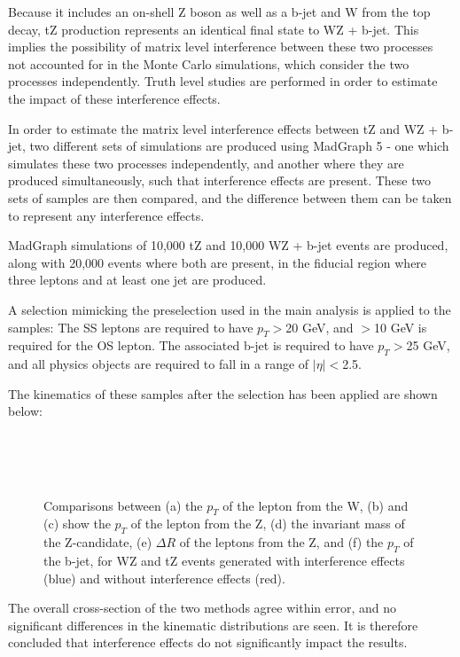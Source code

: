 Because it includes an on-shell Z boson as well as a b-jet and W from the top decay, tZ production represents an identical final state  to WZ + b-jet. This implies the possibility of matrix level interference between these two processes not accounted for in the Monte Carlo simulations, which consider the two processes independently. Truth level studies are performed in order to estimate the impact of these interference effects.    

In order to estimate the matrix level interference effects between tZ and WZ + b-jet, two different sets of simulations are produced using MadGraph 5 \cite{Frederix_2018} - one which simulates these two processes independently, and another where they are  produced simultaneously, such that interference effects are present. These two sets of samples are then compared, and the difference between them can be taken to represent any interference effects.

MadGraph simulations of 10,000 tZ and 10,000 WZ + b-jet events are produced, along with 20,000 events where both are present, in the fiducial region where three leptons and at least one jet are produced.  

A selection mimicking the preselection used in the main analysis is applied to the samples: The SS leptons are required to have $p_T>$20 GeV, and $>$10 GeV is required for the OS lepton. The associated b-jet is required to have $p_T>$25 GeV, and all physics objects are required to fall in a range of $|\eta|<$2.5. 

The kinematics of these samples after the selection has been applied are shown below:

\begin{figure}[H]
    \\
    \\
    \\
    \caption{Comparisons between (a) the $p_T$ of the lepton from the W, (b) and (c) show the $p_T$ of the lepton from the Z, (d)  the invariant mass of the Z-candidate, (e) $\Delta R$ of the leptons from the Z, and (f) the $p_T$ of the b-jet, for WZ and tZ events generated with interference effects (blue) and without interference effects (red).}
\end{figure}

The overall cross-section of the two methods agree within error, and no significant differences in the kinematic distributions are seen. It is therefore concluded that interference effects do not significantly impact the results.

